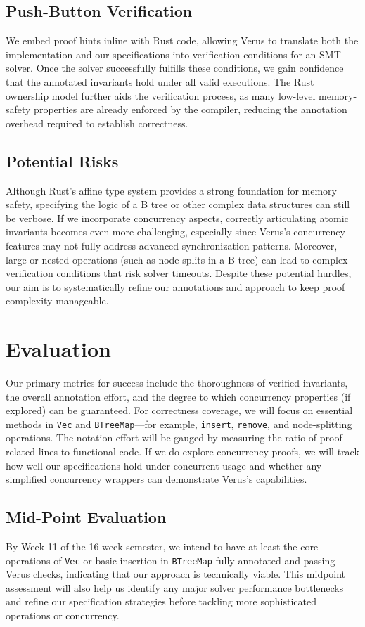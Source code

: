 \documentclass[conference]{IEEEtran}
\begin{document}
\subsection{Push-Button Verification}
We embed proof hints inline with Rust code, allowing Verus to translate both the implementation and our specifications into verification conditions for an SMT solver. Once the solver successfully fulfills these conditions, we gain confidence that the annotated invariants hold under all valid executions. The Rust ownership model further aids the verification process, as many low-level memory-safety properties are already enforced by the compiler, reducing the annotation overhead required to establish correctness.

\subsection{Potential Risks}
Although Rust’s affine type system provides a strong foundation for memory safety, specifying the logic of a B tree or other complex data structures can still be verbose. If we incorporate concurrency aspects, correctly articulating atomic invariants becomes even more challenging, especially since Verus’s concurrency features may not fully address advanced synchronization patterns. Moreover, large or nested operations (such as node splits in a B-tree) can lead to complex verification conditions that risk solver timeouts. Despite these potential hurdles, our aim is to systematically refine our annotations and approach to keep proof complexity manageable.

\section{Evaluation}
Our primary metrics for success include the thoroughness of verified invariants, the overall annotation effort, and the degree to which concurrency properties (if explored) can be guaranteed. For correctness coverage, we will focus on essential methods in \texttt{Vec} and \texttt{BTreeMap}—for example, \texttt{insert}, \texttt{remove}, and node-splitting operations. The notation effort will be gauged by measuring the ratio of proof-related lines to functional code. If we do explore concurrency proofs, we will track how well our specifications hold under concurrent usage and whether any simplified concurrency wrappers can demonstrate Verus’s capabilities.

\subsection{Mid-Point Evaluation}
By Week 11 of the 16-week semester, we intend to have at least the core operations of \texttt{Vec} or basic insertion in \texttt{BTreeMap} fully annotated and passing Verus checks, indicating that our approach is technically viable. This midpoint assessment will also help us identify any major solver performance bottlenecks and refine our specification strategies before tackling more sophisticated operations or concurrency.
\end{document}

